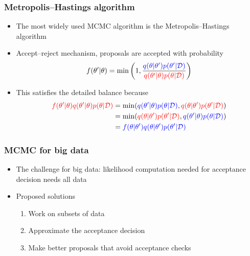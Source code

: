 \documentclass{beamer}
\newcommand{\dataset}{\mathcal{D}}
\newcommand{\parameters}{\theta}
\begin{document}
\begin{frame}
  \frametitle{Metropolis--Hastings algorithm}

  \begin{itemize}
  \item The most widely used MCMC algorithm is the Metropolis--Hastings
    algorithm
  \item Accept--reject mechanism, proposals are accepted with probability
    $$ f(\parameters' | \parameters) = \min\left(1, \frac{\color{blue}q(\parameters | \parameters') p(\parameters' | \dataset)}
      {\color{red}q(\parameters' | \parameters) p(\parameters | \dataset)} \right) $$
  \item This satisfies the detailed balance because
    \begin{align*}
      {\color{red}f(\parameters' | \parameters)
      q(\parameters' | \parameters) p(\parameters | \dataset)}
      &= \min({\color{blue}q(\parameters' | \parameters) p(\parameters | \dataset)},
      {\color{red}q(\parameters | \parameters') p(\parameters' | \dataset)}) \\
      &= \min({\color{red}q(\parameters | \parameters') p(\parameters' | \dataset)},
      {\color{blue}q(\parameters' | \parameters) p(\parameters | \dataset)}) \\
      &= {\color{blue}f(\parameters | \parameters')
      q(\parameters | \parameters') p(\parameters' | \dataset)}
    \end{align*}
  \end{itemize}
\end{frame}

\begin{frame}
  \frametitle{MCMC for big data}

  \begin{itemize}
  \item The challenge for big data: likelihood computation needed for
    acceptance decision needs all data
  \item Proposed solutions
    \begin{enumerate}
    \item Work on subsets of data
    \item Approximate the acceptance decision
    \item Make better proposals that avoid acceptance checks
    \end{enumerate}
  \end{itemize}
\end{frame}
\end{document}
